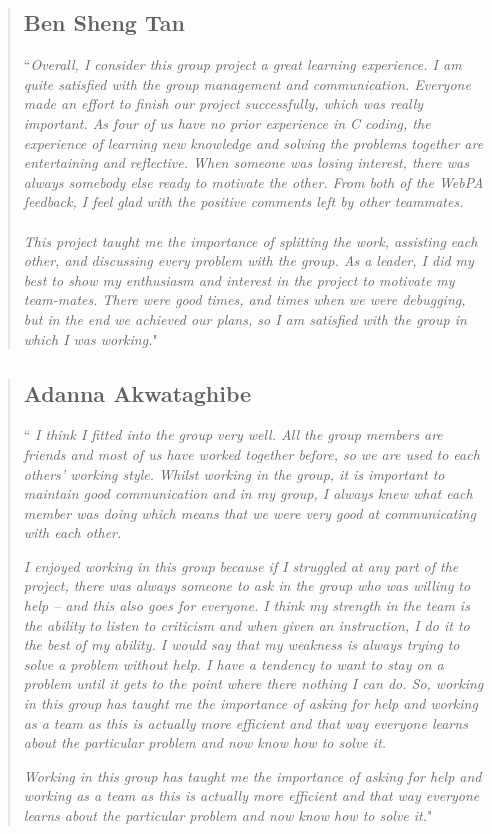 \documentclass[9pt]{article}
\begin{document}
\begin{quote}
\subsection*{Ben Sheng Tan}
``\textit{Overall, I consider this group project a great learning experience.  I am quite satisfied with the group management and communication. Everyone made an effort to finish our project successfully, which was really important. As four of us have no prior experience in C coding, the experience of learning new knowledge and solving the problems together are entertaining and reflective.  When someone was losing interest, there was always somebody else ready to motivate the other. From both of the WebPA feedback, I feel glad with the positive comments left by other teammates. } \\\\

\textit{This project taught me the importance of splitting the work, assisting each other, and discussing every problem with the group. As a leader, I did my best to show my enthusiasm and interest in the project to motivate my team-mates. There were good times, and times when we were debugging, but in the end we achieved our plans, so I am satisfied with the group in which I was working.}"

\end{quote}

\begin{quote}
\subsection*{Adanna Akwataghibe}
``\textit{ I think I fitted into the group very well. All the group members are friends and most of us have worked together before, so we are used to each others' working style. Whilst working in the group, it is important to maintain good communication and in my group, I always knew what each member was doing which means that we were very good at communicating with each other.}

\textit{I enjoyed working in this group because if I struggled at any part of the project, there was always someone to ask in the group who was willing to help – and this also goes for everyone. I think my strength in the team is the ability to listen to criticism and when given an instruction, I do it to the best of my ability. I would say that my weakness is always trying to solve a problem without help. I have a tendency to want to stay on a problem until it gets to the point where there nothing I can do. So, working in this group has taught me the importance of asking for help and working as a team as this is actually more efficient and that way everyone learns about the particular problem and now know how to solve it. }

\textit{Working in this group has taught me the importance of asking for help and working as a team as this is actually more efficient and that way everyone learns about the particular problem and now know how to solve it.}"
\end{quote}
\end{document}
